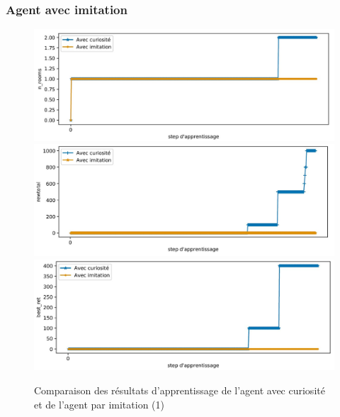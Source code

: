 \documentclass[a4paper,12pt]{report}
\begin{document}
\subsubsection{Agent avec imitation}
\begin{figure}[H]
    \centering
    \includegraphics[width=\textwidth]{curiosity_imitation/curiosity_imitation_n_rooms.JPG}
    \includegraphics[width=\textwidth]{curiosity_imitation/curiosity_imitation_rewtotal.JPG}
    \includegraphics[width=\textwidth]{curiosity_imitation/curiosity_imitation_best_ret.JPG}
    \caption{Comparaison des résultats d'apprentissage de l'agent avec curiosité et de l'agent par imitation (1)}
\end{figure}
\end{document}
